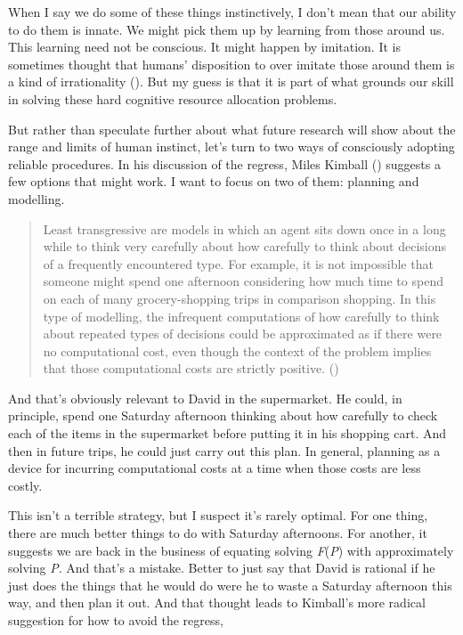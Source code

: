 \documentclass[
  10pt,
  letterpaper,
  DIV=11,
  numbers=noendperiod,
  twoside]{scrartcl}
\begin{document}
When I say we do some of these things instinctively, I don't mean that
our ability to do them is innate. We might pick them up by learning from
those around us. This learning need not be conscious. It might happen by
imitation. It is sometimes thought that humans' disposition to over
imitate those around them is a kind of irrationality
(). But my guess is
that it is part of what grounds our skill in solving these hard
cognitive resource allocation problems.

But rather than speculate further about what future research will show
about the range and limits of human instinct, let's turn to two ways of
consciously adopting reliable procedures. In his discussion of the
regress, Miles Kimball () suggests a few
options that might work. I want to focus on two of them: planning and
modelling.

\begin{quote}
Least transgressive are models in which an agent sits down once in a
long while to think very carefully about how carefully to think about
decisions of a frequently encountered type. For example, it is not
impossible that someone might spend one afternoon considering how much
time to spend on each of many grocery-shopping trips in comparison
shopping. In this type of modelling, the infrequent computations of how
carefully to think about repeated types of decisions could be
approximated as if there were no computational cost, even though the
context of the problem implies that those computational costs are
strictly positive. ()
\end{quote}

And that's obviously relevant to David in the supermarket. He could, in
principle, spend one Saturday afternoon thinking about how carefully to
check each of the items in the supermarket before putting it in his
shopping cart. And then in future trips, he could just carry out this
plan. In general, planning as a device for incurring computational costs
at a time when those costs are less costly.

This isn't a terrible strategy, but I suspect it's rarely optimal. For
one thing, there are much better things to do with Saturday afternoons.
For another, it suggests we are back in the business of equating solving
\emph{F}(\emph{P}) with approximately solving \emph{P}. And that's a
mistake. Better to just say that David is rational if he just does the
things that he would do were he to waste a Saturday afternoon this way,
and then plan it out. And that thought leads to Kimball's more radical
suggestion for how to avoid the regress,
\end{document}
